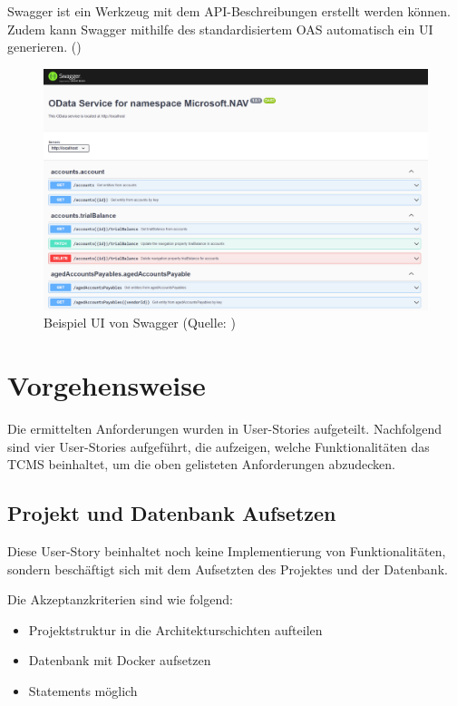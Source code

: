 \documentclass[a4paper, fontsize=11pt, parskip=half, twoside, headings=openright]{scrreprt}
\begin{document}
	Swagger ist ein Werkzeug mit dem \ac{API}-Beschreibungen erstellt werden können.
	Zudem kann Swagger mithilfe des standardisiertem \ac{OAS} automatisch ein \ac{UI} generieren. (\textcite{noauthor_api_nodate})
	\newline
	
	\begin{figure}[ht]
		\centering
		\includegraphics[scale=0.6]{assets/swaggerui.png}
		\caption{Beispiel \ac{UI} von Swagger (Quelle: \textcite{noauthor_host_nodate})}
		\label{fig:swaggeruiExample}
	\end{figure}

	\section{Vorgehensweise} \label{sec:userStoriesDefinition}
	Die ermittelten Anforderungen wurden in User-Stories aufgeteilt. 
	Nachfolgend sind vier User-Stories aufgeführt, die aufzeigen, welche Funktionalitäten das \ac{TCMS} beinhaltet, um die oben gelisteten Anforderungen abzudecken.
	
	\subsection{Projekt und Datenbank Aufsetzen}
	Diese User-Story beinhaltet noch keine Implementierung von Funktionalitäten, sondern beschäftigt sich mit dem Aufsetzten des Projektes und der Datenbank.
	
	Die Akzeptanzkriterien sind wie folgend:
	\begin{itemize}
		\item Projektstruktur in die Architekturschichten aufteilen 
		\item Datenbank mit Docker aufsetzen
		\item {} Statements möglich
	\end{itemize}
\end{document}
